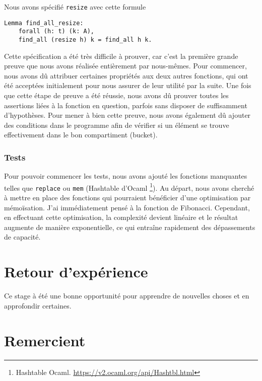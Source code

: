 \documentclass{article}
\begin{document}
Nous avons spécifié \texttt{resize} avec cette formule

\begin{lstlisting}[language=Coq]
  Lemma find_all_resize:
    forall (h: t) (k: A),
    find_all (resize h) k = find_all h k.
\end{lstlisting}

  Cette spécification a été très difficile à prouver, car c'est la première
grande preuve que nous avons réalisée entièrement par nous-mêmes. Pour
commencer, nous avons dû attribuer certaines propriétés aux deux autres
fonctions, qui ont été acceptées initialement pour nous assurer de leur utilité
par la suite. Une fois que cette étape de preuve a été réussie, nous avons dû
prouver toutes les assertions liées à la fonction en question, parfois sans
disposer de suffisamment d'hypothèses. Pour mener à bien cette preuve, nous
avons également dû ajouter des conditions dans le programme afin de vérifier
si un élément se trouve effectivement dans le bon compartiment (bucket).

      \subsubsection{Tests}

Pour pouvoir commencer les tests, nous avons ajouté les fonctions manquantes
telles que \texttt{replace} ou \texttt{mem} (Hashtable d'Ocaml
\footnote{Hashtable Ocaml. \url{https://v2.ocaml.org/api/Hashtbl.html}}).
Au départ, nous avons cherché à mettre en place des fonctions qui pourraient
bénéficier d'une optimisation par mémoïsation. J'ai immédiatement pensé à la
fonction de Fibonacci. Cependant, en effectuant cette optimisation, la
complexité devient linéaire et le résultat augmente de manière exponentielle,
ce qui entraîne rapidement des dépassements de capacité.

  \section{Retour d'expérience}

  Ce stage à été une bonne opportunité pour apprendre de nouvelles choses et
en approfondir certaines.

  \section{Remercient}

  
  
\end{document}
